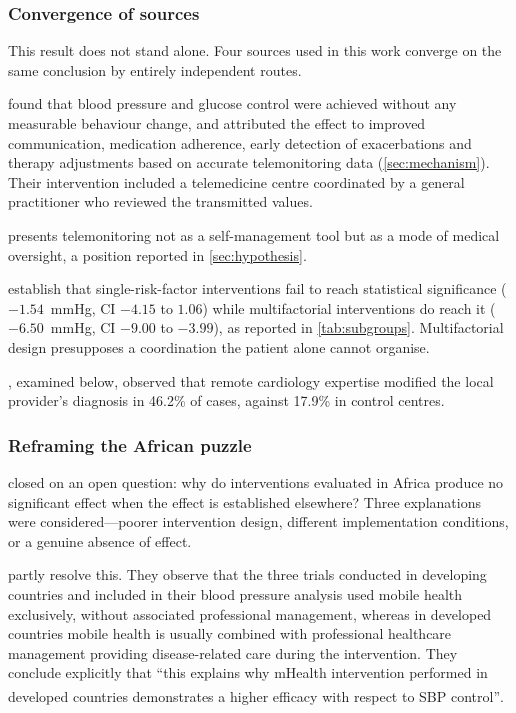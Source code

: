 \documentclass[12pt,a4paper,oneside]{report}
\newcommand{\bq}[1]{``#1''\textsuperscript{\dag}}
\begin{document}
\subsubsection{Convergence of sources}

This result does not stand alone. Four sources used in this work converge on the same conclusion by entirely independent routes.

\Textcite{mihevc2025} found that blood pressure and glucose control were achieved without any measurable behaviour change, and attributed the effect to improved communication, medication adherence, early detection of exacerbations and therapy adjustments based on accurate telemonitoring data (\cref{sec:mechanism}). Their intervention included a telemedicine centre coordinated by a general practitioner who reviewed the transmitted values.

\Textcite{who2023hypertension} presents telemonitoring not as a self-management tool but as a mode of medical oversight, a position reported in \cref{sec:hypothesis}.

\Textcite{zhou2024} establish that single-risk-factor interventions fail to reach statistical significance ($-1.54$~mmHg, CI $-4.15$ to $1.06$) while multifactorial interventions do reach it ($-6.50$~mmHg, CI $-9.00$ to $-3.99$), as reported in \cref{tab:subgroups}. Multifactorial design presupposes a coordination the patient alone cannot organise.

\Textcite{bediang2021}, examined below, observed that remote cardiology expertise modified the local provider's diagnosis in 46.2\% of cases, against 17.9\% in control centres.

\subsubsection{Reframing the African puzzle}\label{sec:african-puzzle}

 closed on an open question: why do interventions evaluated in Africa produce no significant effect when the effect is established elsewhere? Three explanations were considered---poorer intervention design, different implementation conditions, or a genuine absence of effect.

\Textcite{mao2020} partly resolve this. They observe that the three trials conducted in developing countries and included in their blood pressure analysis used mobile health exclusively, without associated professional management, whereas in developed countries mobile health is usually combined with professional healthcare management providing disease-related care during the intervention. They conclude explicitly that \bq{this explains why mHealth intervention performed in developed countries demonstrates a higher efficacy with respect to SBP control}.
\end{document}
